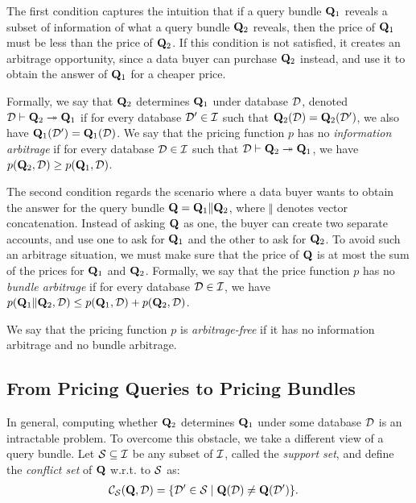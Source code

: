  The first condition captures the intuition that if a query bundle $\mathbf{Q}_1$ reveals a subset of information of what a query bundle $\mathbf{Q}_2$ reveals, then the price of $\mathbf{Q}_1$ must be less than the price of $\mathbf{Q}_2$. If this condition is not satisfied, it creates an arbitrage opportunity, since a data buyer can purchase $\mathbf{Q}_2$ instead, and use it to obtain the answer of $\mathbf{Q}_1$ for a cheaper price. 

Formally, we say that $\mathbf{Q}_2$ determines $\mathbf{Q}_1$ under database $\mathcal{D}$, denoted $\mathcal{D} \vdash \mathbf{Q}_2 \twoheadrightarrow \mathbf{Q}_1$ if for every database $\mathcal{D}' \in \mathcal{I}$ such that $\mathbf{Q}_2(\mathcal{D}) = \mathbf{Q}_2(\mathcal{D}')$, we also have  $\mathbf{Q}_1(\mathcal{D}') = \mathbf{Q}_1(\mathcal{D})$.
We say that the pricing function $p$ has no {\em information arbitrage} if for every database $\mathcal{D} \in \mathcal{I}$ such that $\mathcal{D} \vdash \mathbf{Q}_2 \twoheadrightarrow \mathbf{Q}_1$, we have $p(\mathbf{Q}_2, \mathcal{D}) \geq  p(\mathbf{Q}_1, \mathcal{D})$.

 The second condition regards the scenario where a data buyer wants to obtain the answer for the query bundle $\mathbf{Q} = \mathbf{Q}_1\Vert \mathbf{Q}_2$, where $\Vert$ denotes vector concatenation. Instead of asking $\mathbf{Q}$ as one, the buyer can create two separate accounts, and use one to ask for $\mathbf{Q}_1$ and the other to ask for $\mathbf{Q}_2$. To avoid such an arbitrage situation, we must make sure that the price of $\mathbf{Q}$ is at most the sum of the prices for $\mathbf{Q}_1$ and  $\mathbf{Q}_2$. 
%
Formally, we say that the price function $p$ has no {\em bundle arbitrage} if for every database $\mathcal{D} \in \mathcal{I}$, we have $p(\mathbf{Q}_1\Vert \mathbf{Q}_2, \mathcal{D}) \leq p(\mathbf{Q}_1, \mathcal{D}) + p(\mathbf{Q}_2, \mathcal{D})$.

We say that the pricing function $p$ is {\em arbitrage-free} if it has no information arbitrage and no bundle arbitrage.

\subsection{From Pricing Queries to Pricing Bundles}

In general, computing whether $\mathbf{Q}_2$ determines $\mathbf{Q}_1$ under some database $\mathcal{D}$ is an intractable problem. To overcome this obstacle, we take a different view of a query bundle. Let 
$\mathcal{S} \subseteq \mathcal{I}$ be any subset of $\mathcal{I}$, called the {\em support set}, and define the {\em conflict set} of $\mathbf{Q}$ w.r.t. to $\mathcal{S}$ as:
%
\begin{align*}
{\mathcal{C}}_{\mathcal{S}}(\mathbf{Q},\mathcal{D})  &= \{{\mathcal{D}' \in \mathcal{S}}\mid{\mathbf{Q}(\mathcal{D}) \neq \mathbf{Q}(\mathcal{D}')}\}. 
\end{align*}

